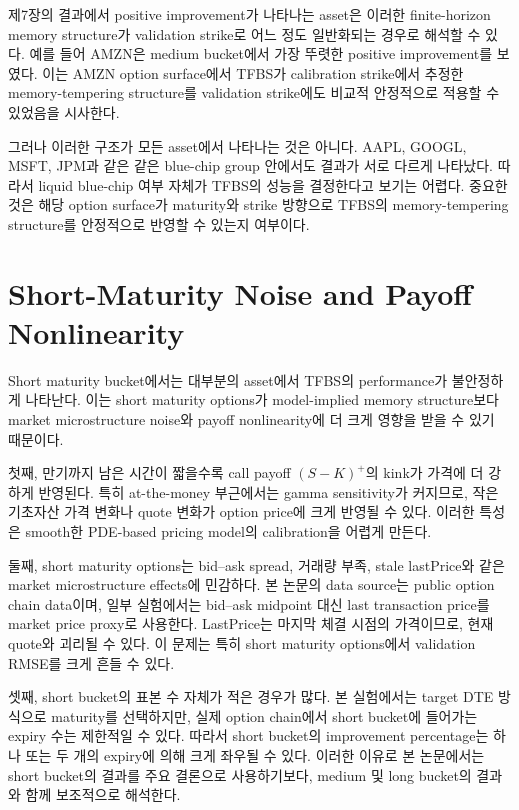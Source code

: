 \documentclass[11pt,a4paper]{report}
\begin{document}
제7장의 결과에서 positive improvement가 나타나는 asset은 이러한 finite-horizon memory structure가 validation strike로 어느 정도 일반화되는 경우로 해석할 수 있다. 예를 들어 AMZN은 medium bucket에서 가장 뚜렷한 positive improvement를 보였다. 이는 AMZN option surface에서 TFBS가 calibration strike에서 추정한 memory-tempering structure를 validation strike에도 비교적 안정적으로 적용할 수 있었음을 시사한다.

그러나 이러한 구조가 모든 asset에서 나타나는 것은 아니다. AAPL, GOOGL, MSFT, JPM과 같은 같은 blue-chip group 안에서도 결과가 서로 다르게 나타났다. 따라서 liquid blue-chip 여부 자체가 TFBS의 성능을 결정한다고 보기는 어렵다. 중요한 것은 해당 option surface가 maturity와 strike 방향으로 TFBS의 memory-tempering structure를 안정적으로 반영할 수 있는지 여부이다.

\section{Short-Maturity Noise and Payoff Nonlinearity}

Short maturity bucket에서는 대부분의 asset에서 TFBS의 performance가 불안정하게 나타난다. 이는 short maturity options가 model-implied memory structure보다 market microstructure noise와 payoff nonlinearity에 더 크게 영향을 받을 수 있기 때문이다.

첫째, 만기까지 남은 시간이 짧을수록 call payoff \((S-K)^+\)의 kink가 가격에 더 강하게 반영된다. 특히 at-the-money 부근에서는 gamma sensitivity가 커지므로, 작은 기초자산 가격 변화나 quote 변화가 option price에 크게 반영될 수 있다. 이러한 특성은 smooth한 PDE-based pricing model의 calibration을 어렵게 만든다.

둘째, short maturity options는 bid--ask spread, 거래량 부족, stale lastPrice와 같은 market microstructure effects에 민감하다. 본 논문의 data source는 public option chain data이며, 일부 실험에서는 bid--ask midpoint 대신 last transaction price를 market price proxy로 사용한다. LastPrice는 마지막 체결 시점의 가격이므로, 현재 quote와 괴리될 수 있다. 이 문제는 특히 short maturity options에서 validation RMSE를 크게 흔들 수 있다.

셋째, short bucket의 표본 수 자체가 적은 경우가 많다. 본 실험에서는 target DTE 방식으로 maturity를 선택하지만, 실제 option chain에서 short bucket에 들어가는 expiry 수는 제한적일 수 있다. 따라서 short bucket의 improvement percentage는 하나 또는 두 개의 expiry에 의해 크게 좌우될 수 있다. 이러한 이유로 본 논문에서는 short bucket의 결과를 주요 결론으로 사용하기보다, medium 및 long bucket의 결과와 함께 보조적으로 해석한다.
\end{document}
